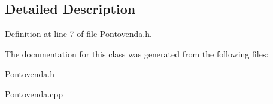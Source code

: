 \subsection{Detailed Description}


Definition at line 7 of file Pontovenda.\+h.



The documentation for this class was generated from the following files\+:\begin{DoxyCompactItemize}
\item 
Pontovenda.\+h\item 
Pontovenda.\+cpp\end{DoxyCompactItemize}
